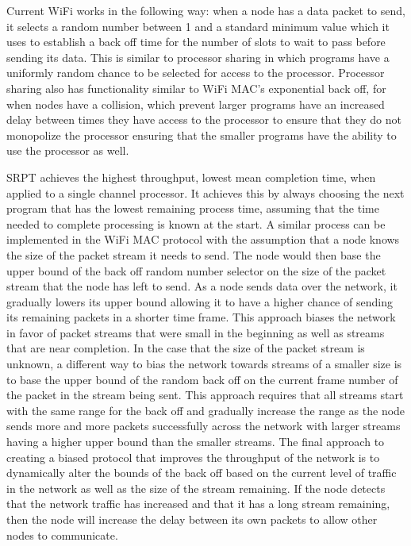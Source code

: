 \documentclass{sigcomm-alternate}
\begin{document}

Current WiFi works in the following way: when a node has a data packet to send, it selects a random number between 1 and a standard minimum value which it uses to establish a back off time for the number of slots to wait to pass before sending its data. This is similar to processor sharing in which programs have a uniformly random chance to be selected for access to the processor. Processor sharing also has functionality similar to WiFi MAC's exponential back off, for when nodes have a collision, which prevent larger programs have an increased delay between times they have access to the processor to ensure that they do not monopolize the processor ensuring that the smaller programs have the ability to use the processor as well.


SRPT achieves the highest throughput, lowest mean completion time, when applied to a single channel processor\cite{schrage}. It achieves this by always choosing the next program that has the lowest remaining process time, assuming that the time needed to complete processing is known at the start. A similar process can be implemented in the WiFi MAC protocol with the assumption that a node knows the size of the packet stream it needs to send. The node would then base the upper bound of the back off random number selector on the size of the packet stream that the node has left to send. As a node sends data over the network, it gradually lowers its upper bound allowing it to have a higher chance of sending its remaining packets in a shorter time frame. This approach biases the network in favor of packet streams that were small in the beginning as well as streams that are near completion. In the case that the size of the packet stream is unknown, a different way to bias the network towards streams of a smaller size is to base the upper bound of the random back off on the current frame number of the packet in the stream being sent. This approach requires that all streams start with the same range for the back off and gradually increase the range as the node sends more and more packets successfully across the network with larger streams having a higher upper bound than the smaller streams. The final approach to creating a biased protocol that improves the throughput of the network is to dynamically alter the bounds of the back off based on the current level of traffic in the network as well as the size of the stream remaining. If the node detects that the network traffic has increased and that it has a long stream remaining, then the node will increase the delay between its own packets to allow other nodes to communicate.
\end{document}
